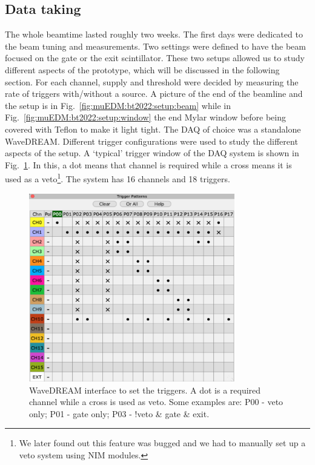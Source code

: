 \begin{refsection}
    \subsection{Data taking}
        The whole beamtime lasted roughly two weeks. 
        The first days were dedicated to the beam tuning and measurements.
        Two settings were defined to have the beam focused on the gate or the exit scintillator. 
        These two setups allowed us to study different aspects of the prototype, which will be discussed in the following section.
        For each channel, supply and threshold were decided by measuring the rate of triggers with/without a  source. 
        A picture of the end of the beamline and the setup is in Fig.~\ref{fig:muEDM:bt2022:setup:beam} while in  Fig.~\ref{fig:muEDM:bt2022:setup:window} the end Mylar window before being covered with Teflon to make it light tight.
        The DAQ of choice was a standalone WaveDREAM.
        Different trigger configurations were used to study the different aspects of the setup. 
        A `typical' trigger window of the DAQ system is shown in Fig.~\ref{fig:muEDM:bt2022:triggers}.
        In this, a dot means that channel is required while a cross means it is used as a veto\footnote{We later found out this feature was bugged and we had to manually set up a veto system using NIM modules.}.
        The system has 16 channels and 18 triggers.
        
        \begin{figure}
            \centering
            \includegraphics[width = 0.8\textwidth]{Figures/muEDM_Nov2022/muEDM2022_triggers.png}
            \caption[muEDM 2022: WaveDREAM trigger GUI]{WaveDREAM interface to set the triggers. A dot is a required channel while a cross is used as veto. Some examples are: P00 - veto only; P01 - gate only; P03 - !veto \& gate \& exit.}
            \label{fig:muEDM:bt2022:triggers}
        \end{figure}
        

\end{refsection}
